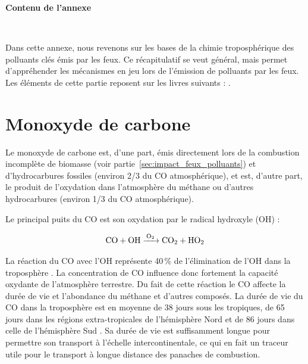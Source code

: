 
\label{annex:chimieAtmo}


\vspace*{\fill}
\begin{singlespace}
\textbf{Contenu de l'annexe}

    
    
~

\startcontents[chapters]
\end{singlespace} 
\vspace*{\fill}

\newpage



Dans cette annexe, nous revenons sur les bases de la chimie troposphérique des polluants clés émis par les feux. Ce récapitulatif se veut général, mais permet d'appréhender les mécanismes en jeu lors de l'émission de polluants par les feux. 
Les éléments de cette partie reposent sur les livres suivants : \citet{jacobIntroductionAtmosphericChemistry1999,delmasPhysiqueChimieLatmosphere2005,brasseurModelingAtmosphericChemistry2017,akimotoHandbookAirQuality2023}.



\section{Monoxyde de carbone}

Le monoxyde de carbone est, d'une part, émis directement lors de la combustion incomplète de biomasse (voir partie~\ref{sec:impact_feux_polluants}) et d'hydrocarbures fossiles (environ 2/3 du CO atmosphérique), et est, d'autre part, le produit de l'oxydation dans l'atmosphère du méthane ou d'autres hydrocarbures (environ 1/3 du CO atmosphérique). 

Le principal puits du CO est son oxydation par le radical hydroxyle (OH) : 

\begin{chemequations}
\begin{align}
\ce{CO + OH  ->[O_2] CO_2 + HO_2 }
\label{equ:R1}	
\end{align}
\end{chemequations}

La réaction du CO avec l'OH représente 40\,\% de l'élimination de l'OH dans la troposphère \citep{lelieveldGlobalTroposphericHydroxyl2016}. La concentration de CO influence donc fortement la capacité oxydante de l'atmosphère terrestre. Du fait de cette réaction le CO affecte la durée de vie et l'abondance du méthane et d'autres composés. La durée de vie du CO dans la troposphère est en moyenne de 38 jours sous les tropiques, de 65 jours dans les régions extra-tropicales de l'hémisphère Nord et de 86 jours dans celle de l'hémisphère Sud \citep{lelieveldGlobalTroposphericHydroxyl2016}. Sa durée de vie est suffisamment longue pour permettre son transport à l'échelle intercontinentale, ce qui en fait un traceur utile pour le transport à longue distance des panaches de combustion.

